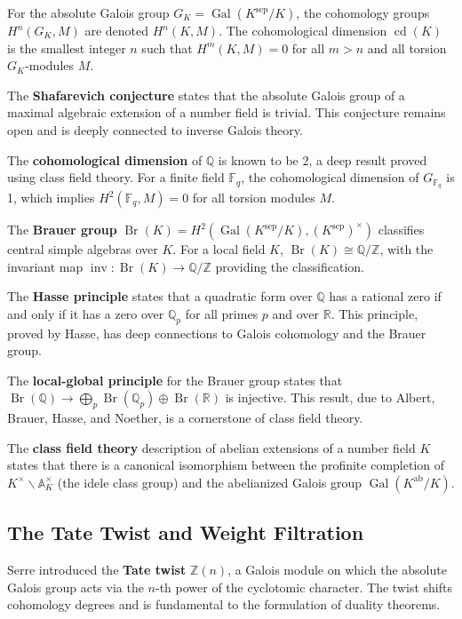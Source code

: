 For the absolute Galois group $G_K = \operatorname{Gal}(K^{\text{sep}}/K)$, the cohomology groups $H^n(G_K, M)$ are denoted $H^n(K, M)$. The cohomological dimension $\operatorname{cd}(K)$ is the smallest integer $n$ such that $H^m(K, M) = 0$ for all $m > n$ and all torsion $G_K$-modules $M$.

The \textbf{Shafarevich conjecture} states that the absolute Galois group of a maximal algebraic extension of a number field is trivial. This conjecture remains open and is deeply connected to inverse Galois theory.

The \textbf{cohomological dimension} of $\mathbb{Q}$ is known to be 2, a deep result proved using class field theory. For a finite field $\mathbb{F}_q$, the cohomological dimension of $G_{\mathbb{F}_q}$ is 1, which implies $H^2(\mathbb{F}_q, M) = 0$ for all torsion modules $M$.

The \textbf{Brauer group} $\operatorname{Br}(K) = H^2(\operatorname{Gal}(K^{\text{sep}}/K), (K^{\text{sep}})^\times)$ classifies central simple algebras over $K$. For a local field $K$, $\operatorname{Br}(K) \cong \mathbb{Q}/\mathbb{Z}$, with the invariant map $\operatorname{inv}: \operatorname{Br}(K) \to \mathbb{Q}/\mathbb{Z}$ providing the classification.

The \textbf{Hasse principle} states that a quadratic form over $\mathbb{Q}$ has a rational zero if and only if it has a zero over $\mathbb{Q}_p$ for all primes $p$ and over $\mathbb{R}$. This principle, proved by Hasse, has deep connections to Galois cohomology and the Brauer group.

The \textbf{local-global principle} for the Brauer group states that $\operatorname{Br}(\mathbb{Q}) \to \bigoplus_p \operatorname{Br}(\mathbb{Q}_p) \oplus \operatorname{Br}(\mathbb{R})$ is injective. This result, due to Albert, Brauer, Hasse, and Noether, is a cornerstone of class field theory.

The \textbf{class field theory} description of abelian extensions of a number field $K$ states that there is a canonical isomorphism between the profinite completion of $K^\times \backslash \mathbb{A}_K^\times$ (the idele class group) and the abelianized Galois group $\operatorname{Gal}(K^{\text{ab}}/K)$.

\subsection{The Tate Twist and Weight Filtration}

Serre introduced the \textbf{Tate twist} $\mathbb{Z}(n)$, a Galois module on which the absolute Galois group acts via the $n$-th power of the cyclotomic character. The twist shifts cohomology degrees and is fundamental to the formulation of duality theorems.

